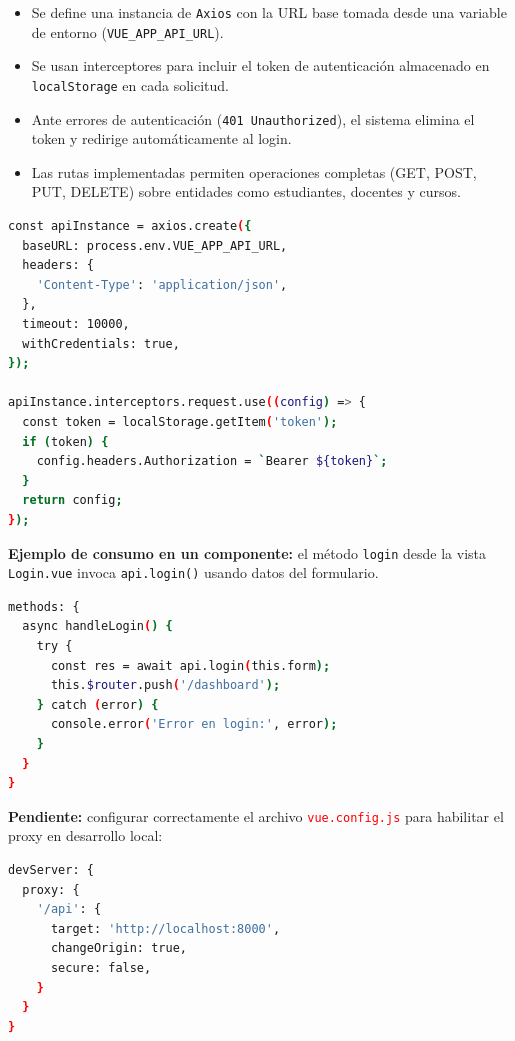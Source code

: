 \documentclass{article}
\begin{document}
\begin{itemize}
  \item Se define una instancia de \texttt{Axios} con la URL base tomada desde una variable de entorno (\texttt{VUE\_APP\_API\_URL}).
  \item Se usan interceptores para incluir el token de autenticación almacenado en \texttt{localStorage} en cada solicitud.
  \item Ante errores de autenticación (\texttt{401 Unauthorized}), el sistema elimina el token y redirige automáticamente al login.
  \item Las rutas implementadas permiten operaciones completas (GET, POST, PUT, DELETE) sobre entidades como estudiantes, docentes y cursos.
\end{itemize}

\begin{lstlisting}[language=bash, caption={Ejemplo de configuración de Axios en api.js}]
const apiInstance = axios.create({
  baseURL: process.env.VUE_APP_API_URL,
  headers: {
    'Content-Type': 'application/json',
  },
  timeout: 10000,
  withCredentials: true,
});

apiInstance.interceptors.request.use((config) => {
  const token = localStorage.getItem('token');
  if (token) {
    config.headers.Authorization = `Bearer ${token}`;
  }
  return config;
});
\end{lstlisting}

\textbf{Ejemplo de consumo en un componente:} el método \texttt{login} desde la vista \texttt{Login.vue} invoca \texttt{api.login()} usando datos del formulario.

\begin{lstlisting}[language=bash, caption={Invocación del login}]
methods: {
  async handleLogin() {
    try {
      const res = await api.login(this.form);
      this.$router.push('/dashboard');
    } catch (error) {
      console.error('Error en login:', error);
    }
  }
}
\end{lstlisting}

\textbf{Pendiente:} configurar correctamente el archivo \texttt{\textcolor{red}{vue.config.js}} para habilitar el proxy en desarrollo local:

\begin{lstlisting}[language=bash, caption={vue.config.js – proxy en desarrollo}]
devServer: {
  proxy: {
    '/api': {
      target: 'http://localhost:8000',
      changeOrigin: true,
      secure: false,
    }
  }
}
\end{lstlisting}
\end{document}
